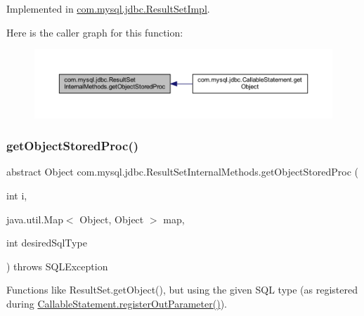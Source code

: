Implemented in \mbox{\hyperlink{classcom_1_1mysql_1_1jdbc_1_1_result_set_impl_a028f86af60dacb114ca80d1cc0637d9b}{com.\+mysql.\+jdbc.\+Result\+Set\+Impl}}.

Here is the caller graph for this function\+:
\nopagebreak
\begin{figure}[H]
\begin{center}
\leavevmode
\includegraphics[width=350pt]{interfacecom_1_1mysql_1_1jdbc_1_1_result_set_internal_methods_a817a3b9788bab58dde079d89c4c0d1d9_icgraph}
\end{center}
\end{figure}
\mbox{\label{interfacecom_1_1mysql_1_1jdbc_1_1_result_set_internal_methods_accf48b92de260b6e92cf8bdd0ec49a29}} 
\subsubsection{\texorpdfstring{get\+Object\+Stored\+Proc()}{getObjectStoredProc()}\hspace{0.1cm}{\footnotesize\ttfamily [2/4]}}
{\footnotesize\ttfamily abstract Object com.\+mysql.\+jdbc.\+Result\+Set\+Internal\+Methods.\+get\+Object\+Stored\+Proc (\begin{DoxyParamCaption}\item[{int}]{i,  }\item[{java.\+util.\+Map$<$ Object, Object $>$}]{map,  }\item[{int}]{desired\+Sql\+Type }\end{DoxyParamCaption}) throws S\+Q\+L\+Exception\hspace{0.3cm}{\ttfamily [abstract]}}

Functions like Result\+Set.\+get\+Object(), but using the given S\+QL type (as registered during \mbox{\hyperlink{classcom_1_1mysql_1_1jdbc_1_1_callable_statement_a5158af0506cf90040062b2049550f59b}{Callable\+Statement.\+register\+Out\+Parameter()}}). 

